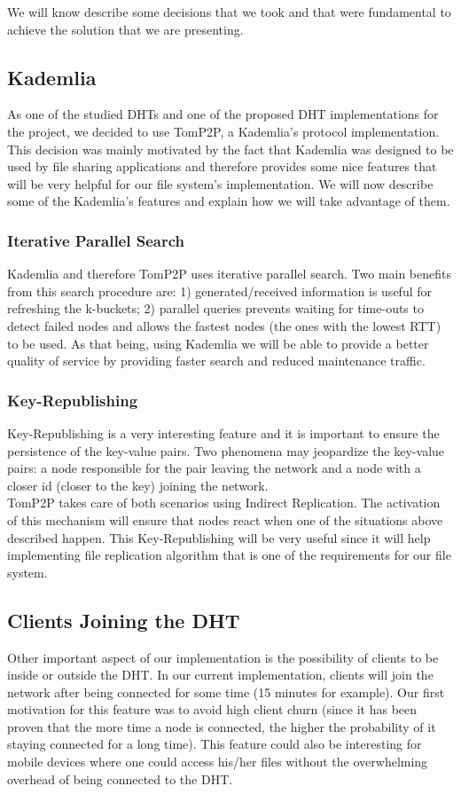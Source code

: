 \documentclass[times,9pt,article]{llncs}
\begin{document}
We will know describe some decisions that we took and that were fundamental to achieve the solution that we are presenting.

\subsection{Kademlia}
As one of the studied DHTs and one of the proposed DHT implementations for the project, we decided to use TomP2P, a Kademlia's protocol implementation.\\
This decision was mainly motivated by the fact that Kademlia was designed to be used by file sharing applications and therefore provides some nice features that will be very helpful for our file system's implementation. We will now describe  some of the Kademlia's features and explain how we will take advantage of them.

\subsubsection{Iterative Parallel Search}
Kademlia and therefore TomP2P uses iterative parallel search. Two main benefits from this search procedure are: 1) generated/received information is useful for  refreshing the k-buckets; 2) parallel queries prevents waiting for time-outs to  detect failed nodes and allows the fastest nodes (the ones with the lowest RTT)  to be used. As that being, using Kademlia we will be able to provide a better  quality of service by providing faster search and reduced maintenance traffic.

\subsubsection{Key-Republishing}
Key-Republishing is a very interesting feature and it is important to ensure the  persistence of the key-value pairs. Two phenomena may jeopardize the key-value pairs: a node responsible for the pair leaving the network and a node with a closer id (closer to the key) joining the network. \\
TomP2P takes care of both scenarios using Indirect Replication. The activation of this mechanism will ensure that nodes react when one of the situations above described happen. This Key-Republishing will be very useful since it will help implementing file replication algorithm that is one of the requirements for our file system.

\subsection{Clients Joining the DHT}
Other important aspect of our implementation is the possibility of clients to be inside or outside the DHT. In our current implementation, clients will join the network after being connected for some time (15 minutes for example). Our first motivation for this feature was to avoid high client churn (since it has been proven that the more time a node is connected, the higher the probability of it staying connected for a long time). This feature could also be interesting for mobile devices where one could access his/her files without the overwhelming overhead of being connected to the DHT.
\end{document}
